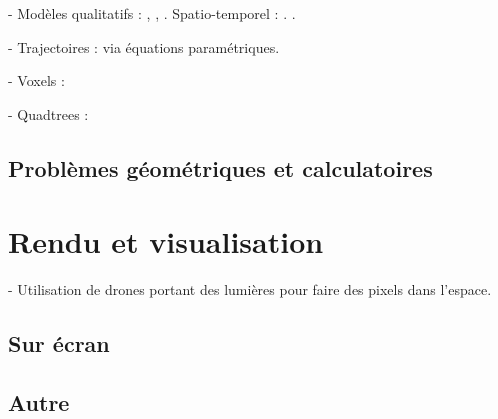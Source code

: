 \documentclass[french,12pt]{article}
\begin{document}
- Modèles qualitatifs : \cite{chen_survey_2015}, \cite{bhatt_geospatial_2014}, \cite{schlieder_qualitative_1996,dorr_qualitative_2014}. Spatio-temporel : \cite{hazarika_qualitative_2012}. \cite{clementini_global_1997}.

- Trajectoires : via équations paramétriques.

- Voxels : \cite{kaufman_volume_1993}

- Quadtrees : \cite{eppstein_skip_2008}
\subsection{Problèmes géométriques et calculatoires}

\section{Rendu et visualisation}
- Utilisation de drones portant des lumières pour faire des pixels dans l'espace.
\cite{hortner_spaxels_2012}
\subsection{Sur écran}
\subsection{Autre}
\printbibliography
\end{document}

